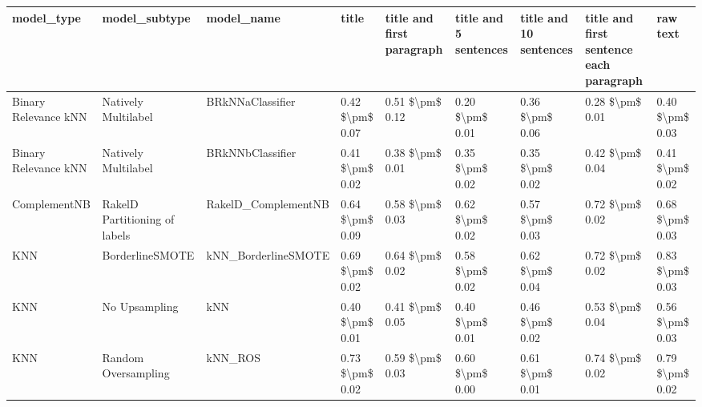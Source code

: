 \begin{tabular}{lllllllll}
\toprule
                     model\_type &                 model\_subtype &                                   model\_name &               title & title and first paragraph & title and 5 sentences & title and 10 sentences & title and first sentence each paragraph &        raw text \\
\midrule
           Binary Relevance kNN &           Natively Multilabel &                             BRkNNaClassifier &     0.42 \$\textbackslash pm\$ 0.07 &           0.51 \$\textbackslash pm\$ 0.12 &       0.20 \$\textbackslash pm\$ 0.01 &        0.36 \$\textbackslash pm\$ 0.06 &                         0.28 \$\textbackslash pm\$ 0.01 & 0.40 \$\textbackslash pm\$ 0.03 \\
           Binary Relevance kNN &           Natively Multilabel &                             BRkNNbClassifier &     0.41 \$\textbackslash pm\$ 0.02 &           0.38 \$\textbackslash pm\$ 0.01 &       0.35 \$\textbackslash pm\$ 0.02 &        0.35 \$\textbackslash pm\$ 0.02 &                         0.42 \$\textbackslash pm\$ 0.04 & 0.41 \$\textbackslash pm\$ 0.02 \\
                   ComplementNB & RakelD Partitioning of labels &                          RakelD\_ComplementNB &     0.64 \$\textbackslash pm\$ 0.09 &           0.58 \$\textbackslash pm\$ 0.03 &       0.62 \$\textbackslash pm\$ 0.02 &        0.57 \$\textbackslash pm\$ 0.03 &                         0.72 \$\textbackslash pm\$ 0.02 & 0.68 \$\textbackslash pm\$ 0.03 \\
                            KNN &               BorderlineSMOTE &                          kNN\_BorderlineSMOTE &     0.69 \$\textbackslash pm\$ 0.02 &           0.64 \$\textbackslash pm\$ 0.02 &       0.58 \$\textbackslash pm\$ 0.02 &        0.62 \$\textbackslash pm\$ 0.04 &                         0.72 \$\textbackslash pm\$ 0.02 & 0.83 \$\textbackslash pm\$ 0.03 \\
                            KNN &                 No Upsampling &                                          kNN &     0.40 \$\textbackslash pm\$ 0.01 &           0.41 \$\textbackslash pm\$ 0.05 &       0.40 \$\textbackslash pm\$ 0.01 &        0.46 \$\textbackslash pm\$ 0.02 &                         0.53 \$\textbackslash pm\$ 0.04 & 0.56 \$\textbackslash pm\$ 0.03 \\
                            KNN &           Random Oversampling &                                      kNN\_ROS &     0.73 \$\textbackslash pm\$ 0.02 &           0.59 \$\textbackslash pm\$ 0.03 &       0.60 \$\textbackslash pm\$ 0.00 &        0.61 \$\textbackslash pm\$ 0.01 &                         0.74 \$\textbackslash pm\$ 0.02 & 0.79 \$\textbackslash pm\$ 0.02 \\

\end{tabular}
